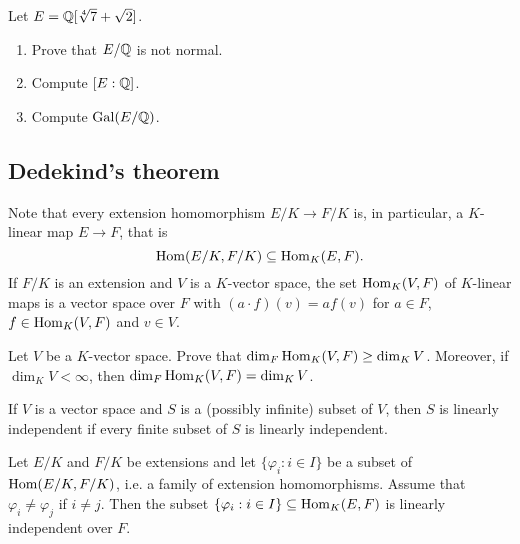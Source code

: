 \begin{exercise}
    Let $E=\mathbb{Q}[\sqrt[4]{7}+\sqrt{2}]$. 
    \begin{enumerate}
        \item Prove that $E/\mathbb{Q}$ is not normal. 
        \item Compute $[E:\mathbb{Q}]$.
        \item Compute $\operatorname{Gal}(E/\mathbb{Q})$. 
    \end{enumerate}
\end{exercise}


\subsection{Dedekind's theorem}

Note that every extension homomorphism $E/K\to F/K$ is, in particular, 
a $K$-linear map $E\to F$, that is
\[
\operatorname{Hom}(E/K,F/K)\subseteq\operatorname{Hom}_K(E,F).
\]
If $F/K$ is an extension and $V$ 
is a $K$-vector space, the set
$\operatorname{Hom}_K(V,F)$ of $K$-linear maps
is a vector space over $F$ with
$(a\cdot f)(v)=af(v)$ for $a\in F$, 
$f\in\operatorname{Hom}_K(V,F)$ and $v\in V$. 

\begin{exercise}
\label{xca:dim}
    Let $V$ be a $K$-vector space. 
    Prove that $\dim_F\operatorname{Hom}_K(V,F)\geq\dim_KV$. Moreover, if 
     $\dim_KV<\infty$, then $\dim_F\operatorname{Hom}_K(V,F)=\dim_KV$.
\end{exercise}

If $V$ is a vector space and $S$ is a (possibly infinite) subset of $V$, 
then $S$ is linearly independent if every finite subset of $S$ is linearly independent. 

\begin{theorem}[Dedekind]
Let $E/K$ and $F/K$ be extensions and let 
$\{\varphi_i:i\in I\}$ 
be a subset of
$\operatorname{Hom}(E/K,F/K)$, i.e. a 
family of extension homomorphisms. Assume that 
$\varphi_i\ne \varphi_j$ if $i\ne j$. Then 
the subset $\{\varphi_i:i\in I\}\subseteq\operatorname{Hom}_K(E,F)$ 
is linearly independent over $F$. 
\end{theorem}

